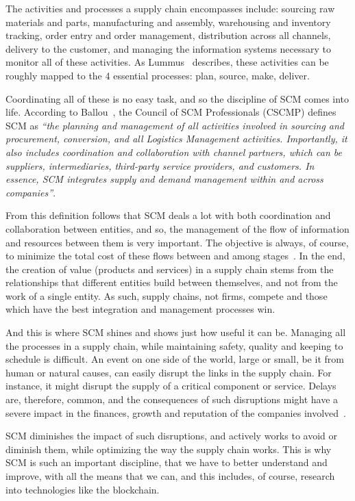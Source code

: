   The activities and processes a supply chain encompasses include: sourcing raw materials and parts, manufacturing and assembly, warehousing and inventory tracking, order entry and order management, distribution across all channels, delivery to the customer, and managing the information systems necessary to monitor all of these activities. As Lummus~\cite{Lummus2014} describes, these activities can be roughly mapped to the 4 essential processes: plan, source, make, deliver.
    
  Coordinating all of these is no easy task, and so the discipline of SCM comes into life. According to Ballou~\cite{Ballou2007}, the Council of SCM Professionals (CSCMP) defines SCM as \textit{“the planning and management of all activities involved in sourcing and procurement, conversion, and all Logistics Management activities. Importantly, it also includes coordination and collaboration with channel partners, which can be suppliers, intermediaries, third-party service providers, and customers. In essence, SCM integrates supply and demand management within and across companies”}.

From this definition follows that SCM deals a lot with both coordination and collaboration between entities, and so, the management of the flow of information and resources between them is very important. The objective is always, of course, to minimize the total cost of these flows between and among stages~\cite{Habib2011}.
In the end, the creation of value (products and services) in a supply chain stems from the relationships that different entities build between themselves, and not from the work of a single entity. As such, supply chains, not firms, compete and those which have the best integration and management processes win.

And this is where SCM shines and shows just how useful it can be. Managing all the processes in a supply chain, while maintaining safety, quality and keeping to schedule is difficult. An event on one side of the world, large or small, be it from human or natural causes, can easily disrupt the links in the supply chain. For instance, it might disrupt the supply of a critical component or service. Delays are, therefore, common, and the consequences of such disruptions might have a severe impact in the finances, growth and reputation of the companies involved~\cite{Punter2013}.

SCM diminishes the impact of such disruptions, and actively works to avoid or diminish them, while optimizing the way the supply chain works. This is why SCM is such an important discipline, that we have to better understand and improve, with all the means that we can, and this includes, of course, research into technologies like the blockchain.

